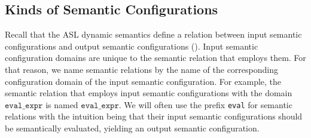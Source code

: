 \subsection{Kinds of Semantic Configurations\label{sec:KindsOfSemanticConfigurations}}

Recall that the ASL dynamic semantics define a relation between input semantic configurations and output semantic configurations
().
Input semantic configuration domains are unique to the semantic relation that employs them.
For that reason, we name semantic relations by the name of the corresponding configuration domain of the input semantic configuration.
For example, the semantic relation that employs input semantic configurations with the domain $\texttt{eval\_expr}$
is named $\texttt{eval\_expr}$.
%
We will often use the prefix \texttt{eval} for semantic relations with the intuition being that their input semantic configurations
should be semantically evaluated, yielding an output semantic configuration.

